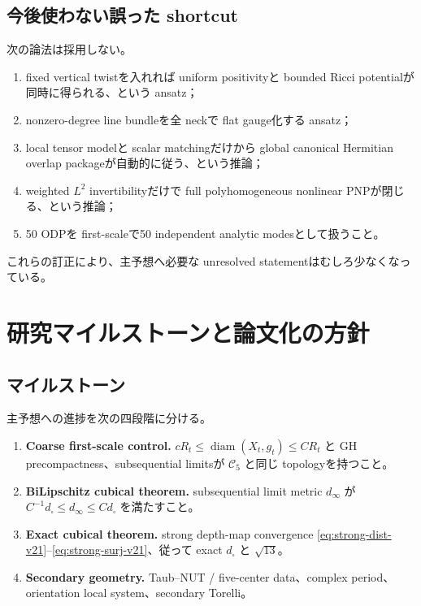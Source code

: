 \documentclass[11pt,a4paper]{ltjsarticle}
\newcommand{\cC}{\mathcal C}
\newcommand{\diam}{\operatorname{diam}}
\theoremstyle{plain}
\theoremstyle{definition}
\theoremstyle{remark}
\begin{document}
\subsection{今後使わない誤った shortcut}
次の論法は採用しない。
\begin{enumerate}
\item fixed vertical twistを入れれば uniform positivityと bounded Ricci potentialが同時に得られる、という ansatz；
\item nonzero-degree line bundleを全 neckで flat gauge化する ansatz；
\item local tensor modelと scalar matchingだけから global canonical Hermitian overlap packageが自動的に従う、という推論；
\item weighted $L^2$ invertibilityだけで full polyhomogeneous nonlinear PNPが閉じる、という推論；
\item 50 ODPを first-scaleで50 independent analytic modesとして扱うこと。
\end{enumerate}

これらの訂正により、主予想へ必要な unresolved statementはむしろ少なくなっている。

\section{研究マイルストーンと論文化の方針}\label{sec:milestones-v21}

\subsection{マイルストーン}
主予想への進捗を次の四段階に分ける。
\begin{enumerate}[label=\textbf{T\arabic*.}]
\item \textbf{Coarse first-scale control.} $cR_t\le\diam(X_t,g_t)\le CR_t$ と GH precompactness、subsequential limitsが $\cC_5$ と同じ topologyを持つこと。
\item \textbf{BiLipschitz cubical theorem.} subsequential limit metric $d_\infty$ が $C^{-1}d_\square\le d_\infty\le Cd_\square$ を満たすこと。
\item \textbf{Exact cubical theorem.} strong depth-map convergence \eqref{eq:strong-dist-v21}--\eqref{eq:strong-surj-v21}、従って exact $d_\square$ と $\sqrt{13}$。
\item \textbf{Secondary geometry.} Taub--NUT / five-center data、complex period、orientation local system、secondary Torelli。
\end{enumerate}
\end{document}
